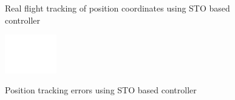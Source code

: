 \documentclass[letterpaper%
, twoside%
, 12pt%
,memoire%
, english%
,creativecommons,hyperref%
]{thETS}
\theoremstyle{newThmStyle}
\begin{document}
\begin{figure}[H]
	\centering
	\parbox{0.75\textwidth}{\caption{Real flight tracking of position coordinates using STO based controller\label{Fig:xyztracSTO}}}
\end{figure}
\begin{figure}[H]
	\includegraphics[width=0.2\textwidth]{Figures/blank.png}
\end{figure}
\begin{figure}[H]
	\centering
	\parbox{0.75\textwidth}{\caption{Position tracking errors using STO based controller\label{Fig:xyzerrSTO}}}
\end{figure}
\end{document}

